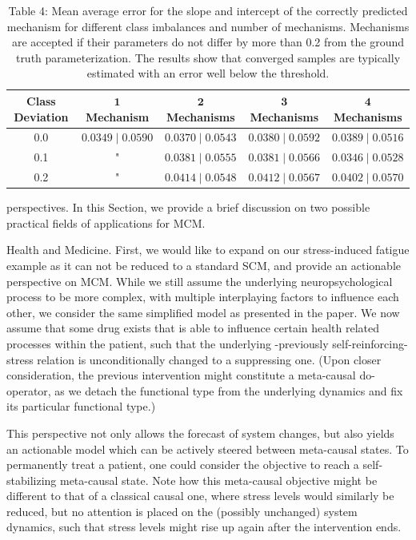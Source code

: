 \documentclass[10pt]{article}
\begin{document}
\begin{table}[h]
\begin{center}
\begin{tabular}{c|cccc}
Class Deviation & $\mathbf{1}$ Mechanism & $\mathbf{2}$ Mechanisms & $\mathbf{3}$ Mechanisms & $\mathbf{4}$ Mechanisms \\
\hline
0.0 & $0.0349 \mid 0.0590$ & $0.0370 \mid 0.0543$ & $0.0380 \mid 0.0592$ & $0.0389 \mid 0.0516$ \\
0.1 & " & $0.0381 \mid 0.0555$ & $0.0381 \mid 0.0566$ & $0.0346 \mid 0.0528$ \\
0.2 & " & $0.0414 \mid 0.0548$ & $0.0412 \mid 0.0567$ & $0.0402 \mid 0.0570$ \\
\end{tabular}
\captionsetup{labelformat=empty}
\caption{Table 4: Mean average error for the slope and intercept of the correctly predicted mechanism for different class imbalances and number of mechanisms. Mechanisms are accepted if their parameters do not differ by more than 0.2 from the ground truth parameterization. The results show that converged samples are typically estimated with an error well below the threshold.}
\end{center}
\end{table}

perspectives. In this Section, we provide a brief discussion on two possible practical fields of applications for MCM.

Health and Medicine. First, we would like to expand on our stress-induced fatigue example as it can not be reduced to a standard SCM, and provide an actionable perspective on MCM. While we still assume the underlying neuropsychological process to be more complex, with multiple interplaying factors to influence each other, we consider the same simplified model as presented in the paper. We now assume that some drug exists that is able to influence certain health related processes within the patient, such that the underlying -previously self-reinforcing- stress relation is unconditionally changed to a suppressing one. (Upon closer consideration, the previous intervention might constitute a meta-causal do-operator, as we detach the functional type from the underlying dynamics and fix its particular functional type.)

This perspective not only allows the forecast of system changes, but also yields an actionable model which can be actively steered between meta-causal states. To permanently treat a patient, one could consider the objective to reach a self-stabilizing meta-causal state. Note how this meta-causal objective might be different to that of a classical causal one, where stress levels would similarly be reduced, but no attention is placed on the (possibly unchanged) system dynamics, such that stress levels might rise up again after the intervention ends.
\end{document}
